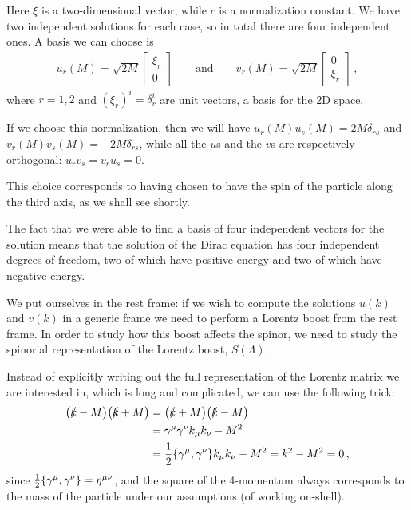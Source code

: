 \documentclass[main.tex]{subfiles}
\begin{document}
Here \(\xi \) is a two-dimensional vector, while \(c\) is a normalization constant. 
We have two independent solutions for each case, so in total there are four independent ones. 
A basis we can choose is 
%
\begin{subequations}
\begin{align}
u_{r} (M) = \sqrt{2M} \left[\begin{array}{c}
\xi_{r} \\ 
0
\end{array}\right]
\qquad \text{and} \qquad
v_{r} (M) = \sqrt{2M} \left[\begin{array}{c}
0 \\
\xi_{r} 
\end{array}\right]
\,,
\end{align}
\end{subequations}
%
where \(r=1,2\) and \((\xi_{r})^{i} = \delta^{i}_{r}\) are unit vectors, a basis for the 2D space. 

If we choose this normalization, then we will have \(\overline{u}_{r}(M) u_s(M) = 2 M \delta_{rs}\) and \(\overline{v}_{r}(M) v_s(M) =- 2 M \delta_{rs}\), while all the \(u\)s and the \(v\)s are respectively orthogonal: \(\overline{u}_{r} v_s =  \overline{v}_{r} u_s = 0\). 

This choice corresponds to having chosen to have the spin of the particle along the third axis, as we shall see shortly. 

The fact that we were able to find a basis of four independent vectors for the solution means that the solution of the Dirac equation has four independent degrees of freedom, two of which have positive energy and two of which have negative energy. 

We put ourselves in the rest frame: if we wish to compute the solutions \(u(k)\) and \(v(k)\) in a generic frame we need to perform a Lorentz boost from the rest frame. 
In order to study how this boost affects the spinor, we need to study the spinorial representation of the Lorentz boost, \(S(\Lambda)\). 

Instead of explicitly writing out the full representation of the Lorentz matrix we are interested in, which is long and complicated, we can use the following trick: 
%
\begin{subequations}
\begin{align} \label{eq:on-shell-equality}
\qty(\slashed{k} - M) \qty(\slashed{k} + M)
&=
\qty(\slashed{k} + M) \qty(\slashed{k} - M) \\
&= \gamma^{\mu } \gamma^{\nu } k_{\mu }k_{\nu } - M^2   \\
&= \frac{1}{2} \qty{\gamma^{\mu }, \gamma^{\nu }} k_{\mu } k_{\nu } - M^2 = k^2-M^2 = 0
\,,
\end{align}
\end{subequations}
%
since \( \frac{1}{2} \qty{\gamma^{\mu }, \gamma^{\nu }} = \eta^{\mu \nu }\), and the square of the 4-momentum always corresponds to the mass of the particle under our assumptions (of working on-shell).
\end{document}
